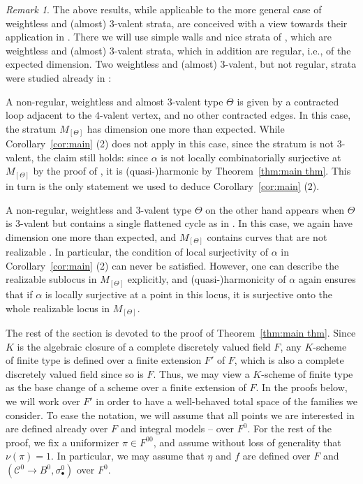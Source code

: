 \documentclass[11pt,reqno]{amsart}
\numberwithin{equation}{section}
\theoremstyle{definition}
\newcommand{\cC}{{\mathcal{C}}}
\theoremstyle{remark}
\newtheorem{rem}[thm]{Remark}
\begin{document}
\begin{rem}
    The above results, while applicable to the more general case of weightless and (almost) $3$-valent strata, are conceived with a view towards their application in \cite{CHT24b}. There we will use simple walls and nice strata of \cite{CHT23}, which are weightless and (almost) $3$-valent strata, which in addition are regular, i.e., of the expected dimension. Two weightless and (almost) $3$-valent, but not regular, strata were studied already in \cite{CHT22}:

    A non-regular, weightless and almost $3$-valent type $\Theta$ is given by a contracted loop adjacent to the $4$-valent vertex, and no other contracted edges. In this case, the stratum $M_{[\Theta]}$ has dimension one more than expected. While Corollary~\ref{cor:main} (2) does not apply in this case, since the stratum is not $3$-valent, the claim still holds: since $\alpha$ is not locally combinatorially surjective at $M_{[\Theta]}$ by the proof of \cite[Lemma~4.6]{CHT22}, it is (quasi-)harmonic by Theorem~\ref{thm:main thm}. This in turn is the only statement we used to deduce Corollary~\ref{cor:main} (2).  

    A non-regular, weightless and $3$-valent type $\Theta$ on the other hand appears when $\Theta$ is $3$-valent but contains a single flattened cycle as in \cite[Definition~3.7]{CHT22}. In this case, we again have dimension one more than expected, and $M_{[\Theta]}$ contains curves that are not realizable \cite[Proposition~3.8]{CHT22}. In particular, the condition of local surjectivity of $\alpha$ in Corollary~\ref{cor:main} (2) can never be satisfied. However, one can describe the realizable sublocus in $M_{[\Theta]}$ explicitly, and (quasi-)harmonicity of $\alpha$
    again ensures that if $\alpha$ is locally surjective at a point in this locus, it is surjective onto the whole realizable locus in $M_{[\Theta]}$. 
\end{rem}

\medskip

The rest of the section is devoted to the proof of Theorem~\ref{thm:main thm}. Since $K$ is the algebraic closure of a complete discretely valued field $F$, any $K$-scheme of finite type is defined over a finite extension $F'$ of $F$, which is also a complete discretely valued field since so is $F$. Thus, we may view a $K$-scheme of finite type as the base change of a scheme over a finite extension of $F$. In the proofs below, we will work over $F'$ in order to have a well-behaved total space of the families we consider. To ease the notation, we will assume that all points we are interested in are defined already over $F$ and integral models -- over $F^0$. For the rest of the proof, we fix a uniformizer $\pi\in F^{00}$, and assume without loss of generality that $\nu(\pi)=1$. In particular, we may assume that $\eta$ and $f$ are defined over $F$ and $(\cC^0\rightarrow B^0,\sigma^0_\bullet)$ over $F^0$. 
\end{document}

